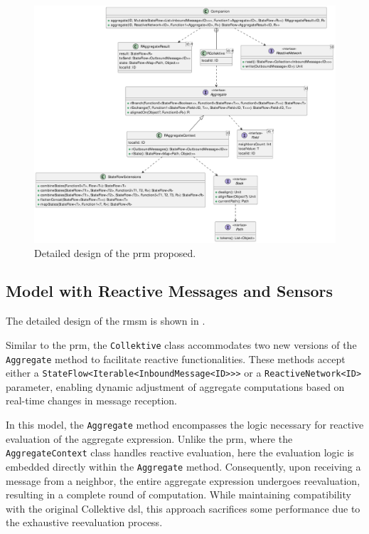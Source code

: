 \begin{figure}
    \centering
    \includegraphics[width=\linewidth]{figures/collektive-prm-design.pdf}
    \caption{Detailed design of the \ac{prm} proposed.}
    \label{fig:collektive-prm-design}
\end{figure}

\subsection{Model with Reactive Messages and Sensors}
The detailed design of the \ac{rmsm} is shown in .

Similar to the \ac{prm}, the \texttt{Collektive} class accommodates two new versions of the \texttt{Aggregate} method to facilitate reactive functionalities. These methods accept either a \texttt{StateFlow<Iterable<InboundMessage<ID>>>} or a \texttt{ReactiveNetwork<ID>} parameter, enabling dynamic adjustment of aggregate computations based on real-time changes in message reception.

In this model, the \texttt{Aggregate} method encompasses the logic necessary for reactive evaluation of the aggregate expression. Unlike the \ac{prm}, where the \texttt{AggregateContext} class handles reactive evaluation, here the evaluation logic is embedded directly within the \texttt{Aggregate} method. Consequently, upon receiving a message from a neighbor, the entire aggregate expression undergoes reevaluation, resulting in a complete round of computation. While maintaining compatibility with the original Collektive \ac{dsl}, this approach sacrifices some performance due to the exhaustive reevaluation process.

